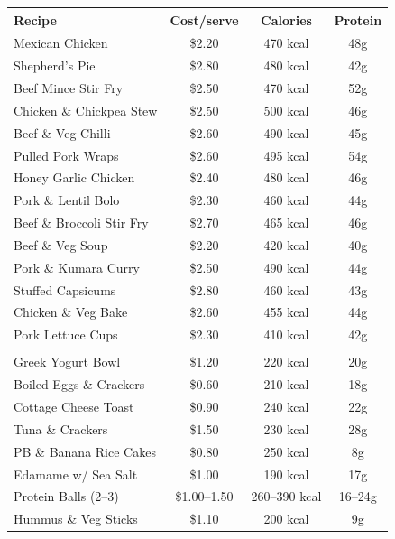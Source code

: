 \documentclass[12pt, a4paper]{book}
\begin{document}
\begin{tabularx}{\linewidth}{|X|c|c|c|}
  \hline
  \rowcolor{primary!20}
  \textbf{Recipe} & \textbf{Cost/serve} & \textbf{Calories} & \textbf{Protein} \\
  \hline
  Mexican Chicken          & \$2.20 & 470 kcal & 48g \\
  \hline
  Shepherd's Pie           & \$2.80 & 480 kcal & 42g \\
  \hline
  Beef Mince Stir Fry      & \$2.50 & 470 kcal & 52g \\
  \hline
  Chicken \& Chickpea Stew & \$2.50 & 500 kcal & 46g \\
  \hline
  Beef \& Veg Chilli       & \$2.60 & 490 kcal & 45g \\
  \hline
  Pulled Pork Wraps        & \$2.60 & 495 kcal & 54g \\
  \hline
  Honey Garlic Chicken     & \$2.40 & 480 kcal & 46g \\
  \hline
  Pork \& Lentil Bolo      & \$2.30 & 460 kcal & 44g \\
  \hline
  Beef \& Broccoli Stir Fry & \$2.70 & 465 kcal & 46g \\
  \hline
  Beef \& Veg Soup         & \$2.20 & 420 kcal & 40g \\
  \hline
  Pork \& Kumara Curry     & \$2.50 & 490 kcal & 44g \\
  \hline
  Stuffed Capsicums        & \$2.80 & 460 kcal & 43g \\
  \hline
  Chicken \& Veg Bake      & \$2.60 & 455 kcal & 44g \\
  \hline
  Pork Lettuce Cups        & \$2.30 & 410 kcal & 42g \\
  \hline
  \hline
  \rowcolor{primary!10}
  \multicolumn{4}{|l|}{\textbf{Snacks}} \\
  \hline
  Greek Yogurt Bowl        & \$1.20 & 220 kcal & 20g \\
  \hline
  Boiled Eggs \& Crackers  & \$0.60 & 210 kcal & 18g \\
  \hline
  Cottage Cheese Toast     & \$0.90 & 240 kcal & 22g \\
  \hline
  Tuna \& Crackers         & \$1.50 & 230 kcal & 28g \\
  \hline
  PB \& Banana Rice Cakes  & \$0.80 & 250 kcal & 8g \\
  \hline
  Edamame w/ Sea Salt      & \$1.00 & 190 kcal & 17g \\
  \hline
  Protein Balls (2--3)     & \$1.00--1.50 & 260--390 kcal & 16--24g \\
  \hline
  Hummus \& Veg Sticks     & \$1.10 & 200 kcal & 9g \\

\end{tabularx}
\end{document}

